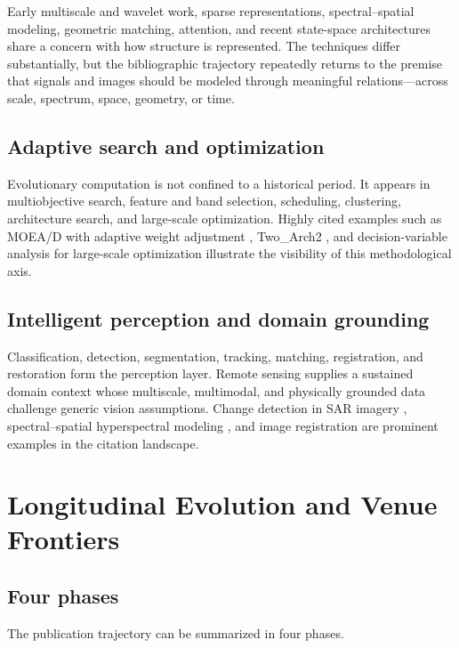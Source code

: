 \documentclass[11pt]{article}
\begin{document}
Early multiscale and wavelet work, sparse representations, spectral--spatial
modeling, geometric matching, attention, and recent state-space architectures
share a concern with how structure is represented. The techniques differ
substantially, but the bibliographic trajectory repeatedly returns to the
premise that signals and images should be modeled through meaningful
relations---across scale, spectrum, space, geometry, or time.

\subsection{Adaptive search and optimization}

Evolutionary computation is not confined to a historical period. It appears in
multiobjective search, feature and band selection, scheduling, clustering,
architecture search, and large-scale optimization. Highly cited examples such
as MOEA/D with adaptive weight adjustment \cite{qi2014moead}, Two\_Arch2
\cite{wang2015twoarch}, and decision-variable analysis for large-scale
optimization \cite{ma2016largevariables} illustrate the visibility of this
methodological axis.

\subsection{Intelligent perception and domain grounding}

Classification, detection, segmentation, tracking, matching, registration, and
restoration form the perception layer. Remote sensing supplies a sustained
domain context whose multiscale, multimodal, and physically grounded data
challenge generic vision assumptions. Change detection in SAR imagery
\cite{gong2016sarchange}, spectral--spatial hyperspectral modeling
\cite{zhu2021ressan}, and image registration \cite{ma2017registration} are
prominent examples in the citation landscape.

\section{Longitudinal Evolution and Venue Frontiers}

\subsection{Four phases}

The publication trajectory can be summarized in four phases.
\end{document}
